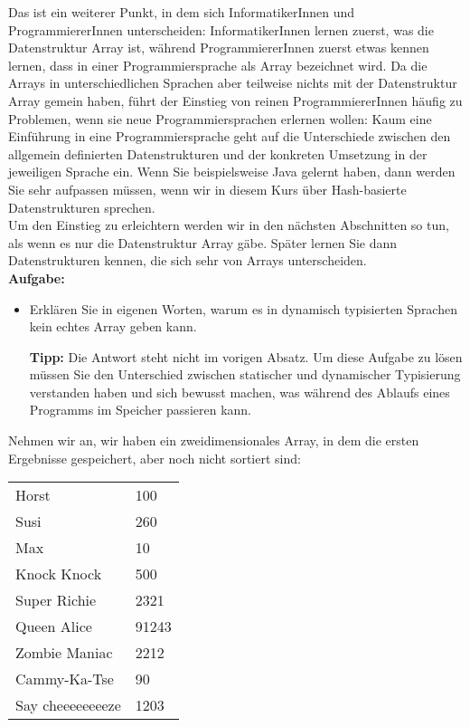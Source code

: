 Das ist ein weiterer Punkt, in dem sich InformatikerInnen und ProgrammiererInnen unterscheiden: InformatikerInnen lernen zuerst, was die Datenstruktur Array ist, während ProgrammiererInnen zuerst etwas kennen lernen, dass in einer Programmiersprache als Array bezeichnet wird. Da die \glqq{}Arrays\grqq{} in unterschiedlichen Sprachen aber teilweise nichts mit der Datenstruktur Array gemein haben, führt der Einstieg von reinen ProgrammiererInnen häufig zu Problemen, wenn sie neue Programmiersprachen erlernen wollen: Kaum eine Einführung in eine Programmiersprache geht auf die Unterschiede zwischen den allgemein definierten Datenstrukturen und der konkreten Umsetzung in der jeweiligen Sprache ein. Wenn Sie beispielsweise Java gelernt haben, dann werden Sie sehr aufpassen müssen, wenn wir in diesem Kurs über Hash-basierte Datenstrukturen sprechen.\\

Um den Einstieg zu erleichtern werden wir in den nächsten Abschnitten so tun, als wenn es nur die Datenstruktur Array gäbe. Später lernen Sie dann Datenstrukturen kennen, die sich sehr von Arrays unterscheiden.\\

\textbf{Aufgabe:}

\begin{itemize}
	\item Erklären Sie in eigenen Worten, warum es in dynamisch typisierten Sprachen kein \glqq{}echtes\grqq{} Array geben kann.
	
	\textbf{Tipp:} Die Antwort steht nicht im vorigen Absatz. Um diese Aufgabe zu lösen müssen Sie den Unterschied zwischen statischer und dynamischer Typisierung verstanden haben und sich bewusst machen, was während des Ablaufs eines Programms im Speicher passieren kann.
\end{itemize}

Nehmen wir an, wir haben ein zweidimensionales Array, in dem die ersten Ergebnisse gespeichert, aber noch nicht sortiert sind:\\

\begin{tabular}{l l}
	Horst & 100 \\
	Susi & 260 \\
	Max & 10 \\
	Knock Knock & 500 \\
	Super Richie & 2321\\
	Queen Alice & 91243 \\
	Zombie Maniac & 2212 \\
	Cammy-Ka-Tse & 90 \\
	Say cheeeeeeeeze & 1203 \\
\end{tabular}\\

